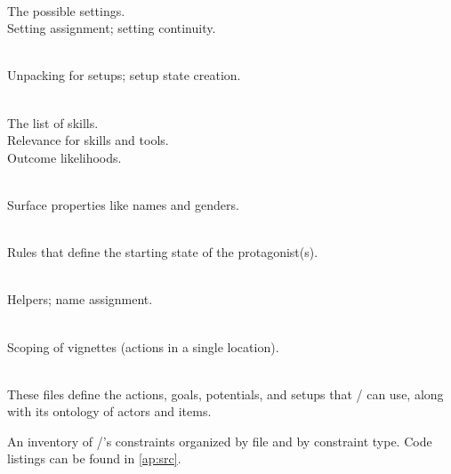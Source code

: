 \begin{table}[!p]
\begin{minipage}[t][0.935\textheight]{\dimexpr0.5\textwidth-1.2em}
\begin{hangparas}{0.8em}{1}
   \\
  \cg{[content]} The possible settings. \\
  \cg{[representational]} Setting assign\-ment; setting continuity.

   \\
  \cg{[representational]} Unpacking for setups; setup state creation.

   \\
  \cg{[content]} The list of skills. \\
  \cg{[representational]} Relevance for skills and tools. \\
  \cg{[constituent]} Outcome likelihoods.

   \\
  \cg{[representational]} Surface properties like names and genders.

   \\
  \cg{[content]} Rules that define the starting state of the protagonist(s).

   \\
  \cg{[other]} Helpers; name assignment.

   \\
  \cg{[constituent]} Scoping of vignettes (actions in a single location).

   \\
  \cg{[content]} These files define the actions, goals, potentials, and setups that \dunyazad/ can use, along with its ontology of actors and items.
\end{hangparas}%
\end{minipage}%
\caption[\dunyazad/ constraints inventory]{An inventory of \dunyazad/'s constraints organized by file and by constraint type. Code listings can be found in \cref{ap:src}.}
\label{tab:dunyazad-constraints-inventory}
\end{table}

